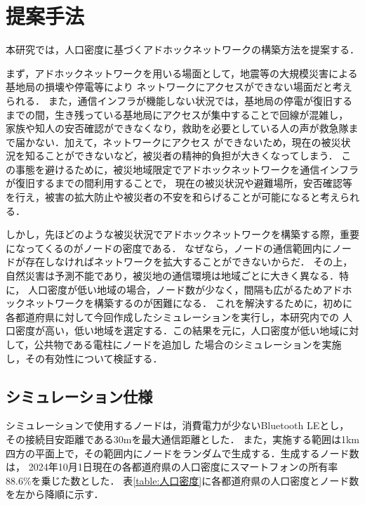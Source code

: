 \documentclass[a4paper, 11pt]{ltjsarticle}
\begin{document}

\clearpage
\section{提案手法} \label{提案手法}
本研究では，人口密度に基づくアドホックネットワークの構築方法を提案する．

まず，アドホックネットワークを用いる場面として，地震等の大規模災害による基地局の損壊や停電等により
ネットワークにアクセスができない場面だと考えられる．
また，通信インフラが機能しない状況では，基地局の停電が復旧するまでの間，生き残っている基地局にアクセスが集中することで回線が混雑し，
家族や知人の安否確認ができなくなり，救助を必要としている人の声が救急隊まで届かない．加えて，ネットワークにアクセス
ができないため，現在の被災状況を知ることができないなど，被災者の精神的負担が大きくなってしまう．
この事態を避けるために，被災地域限定でアドホックネットワークを通信インフラが復旧するまでの間利用することで，
現在の被災状況や避難場所，安否確認等を行え，被害の拡大防止や被災者の不安を和らげることが可能になると考えられる．

しかし，先ほどのような被災状況でアドホックネットワークを構築する際，重要になってくるのがノードの密度である．
なぜなら，ノードの通信範囲内にノードが存在しなければネットワークを拡大することができないからだ．
その上，自然災害は予測不能であり，被災地の通信環境は地域ごとに大きく異なる．特に，
人口密度が低い地域の場合，ノード数が少なく，間隔も広がるためアドホックネットワークを構築するのが困難になる．
これを解決するために，初めに各都道府県に対して今回作成したシミュレーションを実行し，本研究内での
人口密度が高い，低い地域を選定する．この結果を元に，人口密度が低い地域に対して，公共物である電柱にノードを追加し
た場合のシミュレーションを実施し，その有効性について検証する．

\subsection{シミュレーション仕様}
シミュレーションで使用するノードは，消費電力が少ないBluetooth LEとし，
その接続目安距離である30mを最大通信距離とした．
また，実施する範囲は1km四方の平面上で，その範囲内にノードをランダムで生成する．生成するノード数は，
2024年10月1日現在の各都道府県の人口密度\cite{人口密度}にスマートフォンの所有率88.6\%\cite{スマホ保有率}を乗じた数とした．
表\ref{table:人口密度}に各都道府県の人口密度とノード数を左から降順に示す．
\end{document}
